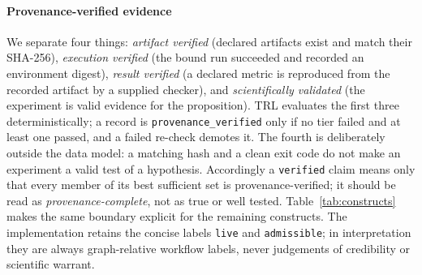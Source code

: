 \documentclass[journal]{IEEEtran}
\begin{document}
\paragraph{Provenance-verified evidence}
We separate four things: \emph{artifact verified} (declared artifacts exist and match their SHA-256), \emph{execution verified} (the bound run succeeded and recorded an environment digest), \emph{result verified} (a declared metric is reproduced from the recorded artifact by a supplied checker), and \emph{scientifically validated} (the experiment is valid evidence for the proposition). TRL evaluates the first three deterministically; a record is \texttt{provenance\_verified} only if no tier failed and at least one passed, and a failed re-check demotes it. The fourth is deliberately outside the data model: a matching hash and a clean exit code do not make an experiment a valid test of a hypothesis. Accordingly a \texttt{verified} claim means only that every member of its best sufficient set is provenance-verified; it should be read as \emph{provenance-complete}, not as true or well tested. Table~\ref{tab:constructs} makes the same boundary explicit for the remaining constructs. The implementation retains the concise labels \texttt{live} and \texttt{admissible}; in interpretation they are always graph-relative workflow labels, never judgements of credibility or scientific warrant.
\end{document}
